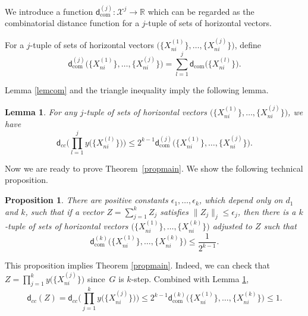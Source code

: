 \documentclass[pdftex]{sigma}
\numberwithin{equation}{section}
\newtheorem{Lemma}[Theorem]{Lemma}
\newtheorem{Proposition}[Theorem]{Proposition}
\newcommand{\R}{\mathbb{R}}
\begin{document}
We introduce a function $\mathsf{d}_{\mathrm{com}}^{(j)}\colon \mathcal{X}^j\to\R$ which can be regarded as the combinatorial distance function for a $j$-tuple of sets of horizontal vectors.

\begin{Definition}
 For a $j$-tuple of sets of horizontal vectors $\big(\bigl\{X_{ni}^{(1)}\bigr\},\dots,\bigl\{X_{ni}^{(j)}\bigr\}\big)$,
 define
 \[\mathsf{d}_{\mathrm{com}}^{(j)}\big(\bigl\{X_{ni}^{(1)}\bigr\},\dots,\bigl\{X_{ni}^{(j)}\bigr\}\big)= \sum_{l=1}^j\mathsf{d}_{\mathrm{com}}\big(\bigl\{X_{ni}^{(l)}\bigr\}\big).\]
\end{Definition}

Lemma \ref{lemcom} and the triangle inequality imply the following lemma.

\begin{Lemma}\label{lemcom2}
 For any $j$-tuple of sets of horizontal vectors $\big(\bigl\{X_{ni}^{(1)}\bigr\},\dots,\bigl\{X_{ni}^{(j)}\bigr\}\big)$,
 we have
 \[
 \mathsf{d}_{cc}\Bigg(\prod_{l=1}^jy\big(\bigl\{X_{ni}^{(l)}\bigr\}\big)\Bigg)\leq 2^{k-1}\mathsf{d}_{\mathrm{com}}^{(j)}\big(\bigl\{X_{ni}^{(1)}\bigr\}, \dots,\bigl\{X_{ni}^{(j)}\bigr\}\big).
 \]
\end{Lemma}

Now we are ready to prove Theorem~\ref{propmain}.
We show the following technical proposition.

\begin{Proposition}
 There are positive constants $\epsilon_1,\dots,\epsilon_k$,
 which depend only on $d_1$ and $k$,
 such that if a vector $Z=\sum_{j=1}^k Z_j$ satisfies $\|Z_j\|_j\leq \epsilon_j$,
 then there is a $k$-tuple of sets of horizontal vectors $\big(\bigl\{X_{ni}^{(1)}\bigr\},\dots,\bigl\{X_{ni}^{(k)}\bigr\}\big)$ adjusted to $Z$ such that
 \[
 \mathsf{d}_{\mathrm{com}}^{(k)}\big(\bigl\{X_{ni}^{(1)}\bigr\},\dots, \bigl\{X_{ni}^{(k)}\bigr\}\big)\leq \frac{1}{2^{k-1}}.
 \]
\end{Proposition}

This proposition implies Theorem \ref{propmain}.
Indeed,
we can check that $Z=\prod_{j=1}^ky\big(\bigl\{X_{ni}^{(j)}\bigr\}\big)$ since~$G$ is $k$-step.
Combined with Lemma \ref{lemcom2},
\[
\mathsf{d}_{cc}(Z)=\mathsf{d}_{cc}\Bigg(\prod_{j=1}^ky\big(\bigl\{X_{ni}^{(j)}\bigr\}\big)\Bigg)\leq 2^{k-1}\mathsf{d}_{\mathrm{com}}^{(k)}\big(\bigl\{X_{ni}^{(1)}\bigr\}, \dots,\bigl\{X_{ni}^{(k)}\bigr\}\big)\leq 1.
\]
\end{document}
